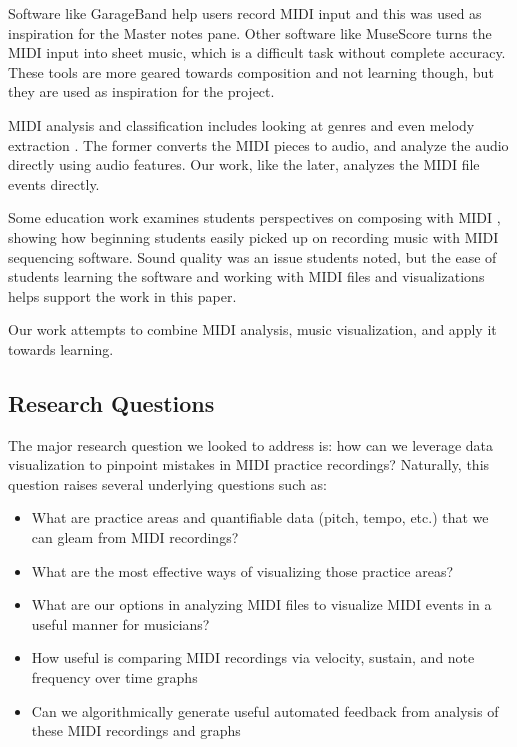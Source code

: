 \documentclass[journal]{vgtc}                %
\begin{document}
Software like GarageBand \cite{garage-band} help users record MIDI input and this was used as inspiration for the Master notes pane. Other
software like MuseScore \cite{muse-score} turns the MIDI input into sheet music, which is a difficult task without complete accuracy.
These tools are more geared towards composition and not learning though, but they are used as inspiration for the project.

MIDI analysis and classification includes looking at genres \cite{genre-classification}
and even melody extraction \cite{melody-extraction}. The former converts the MIDI pieces to audio,
and analyze the audio directly using audio features. Our work, like the later, analyzes the MIDI file events directly.

Some education work examines students perspectives on composing with MIDI \cite{student-perspectives}, showing how
beginning students easily picked up on recording music with MIDI sequencing software. Sound quality was an issue
students noted, but the ease of students learning the software and working with MIDI files and visualizations
helps support the work in this paper.

Our work attempts to combine MIDI analysis, music visualization, and apply it towards learning.

\subsection{Research Questions}

The major research question we looked to address is: how can we leverage data
visualization to pinpoint mistakes in MIDI practice recordings? Naturally,
this question raises several underlying questions such as:

\begin{itemize}
  \item What are practice areas and quantifiable data (pitch, tempo, etc.) that
  we can gleam from MIDI recordings?
  \item What are the most effective ways of visualizing those practice areas?
  \item What are our options in analyzing MIDI files to visualize MIDI events
  in a useful manner for musicians?
  \item How useful is comparing MIDI recordings via velocity, sustain, and note
  frequency over time graphs
  \item Can we algorithmically generate useful automated feedback from analysis
  of these MIDI recordings and graphs
\end{itemize}
\end{document}
